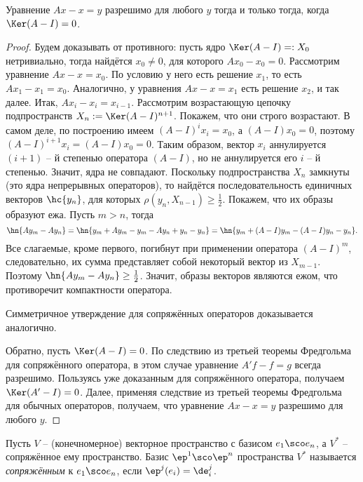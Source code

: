 \documentclass[a4paper]{article}
\begin{document}
\begin{theorem}
Уравнение $Ax-x = y$ разрешимо для любого $y$ тогда и только тогда, когда $\Ker(A-I) = 0$.
\end{theorem}
\begin{proof}
Будем доказывать от противного: пусть ядро $\Ker(A-I) =: X_0$ нетривиально, тогда
найдётся $x_0 \neq 0$, для которого $Ax_0 - x_0 = 0$. Рассмотрим уравнение $Ax -x = x_0$.
По условию у него есть решение $x_1$, то есть $Ax_1 - x_1 = x_0$. Аналогично, у уравнения
$Ax-x = x_1$ есть решение $x_2$, и так далее. Итак, $Ax_i - x_i = x_{i-1}$.
Рассмотрим возрастающую цепочку подпространств $X_n := \Ker(A-I)^{n+1}$.
Покажем, что они строго возрастают. В самом деле, по построению имеем $(A-I)^ix_i = x_0$,
а $(A-I)x_0 = 0$, поэтому $(A-I)^{i+1}x_i = (A-I)x_0 = 0$. Таким образом, вектор $x_i$
аннулируется $(i+1)$ -- й степенью оператора $(A-I)$, но не аннулируется его $i$ -- й степенью.
Значит, ядра не совпадают. Поскольку подпространства $X_n$ замкнуты (это ядра непрерывных операторов),
то найдётся последовательность единичных векторов $\hc{y_n}$, для которых $\rho(y_n, X_{n-1}) \ge \frac12$.
Покажем, что их образы образуют ежа. Пусть $m > n$, тогда
$$\hn{Ay_m - Ay_n} = \hn{y_m + Ay_m - y_m - Ay_n + y_n - y_n} = \hn{y_m + (A-I)y_m - (A-I)y_n - y_n}.$$
Все слагаемые, кроме первого, погибнут при применении оператора $(A-I)^m$, следовательно, их сумма
представляет собой некоторый вектор из $X_{m-1}$. Поэтому $\hn{Ay_m - Ay_n} \ge \frac12$. Значит,
образы векторов являются ежом, что противоречит компактности оператора.

Симметричное утверждение для сопряжённых операторов доказывается аналогично.

Обратно, пусть $\Ker(A-I)=0$. По следствию из третьей теоремы Фредгольма
для сопряжённого оператора, в этом случае уравнение $A'f-f = g$ всегда разрешимо.
Пользуясь уже доказанным  для сопряжённого оператора, получаем $\Ker(A'-I) = 0$.
Далее, применяя следствие из третьей теоремы Фредгольма для обычных операторов,
получаем, что уравнение $Ax -x = y$ разрешимо для любого $y$.
\end{proof}

\begin{df}
Пусть $V$ -- (конечномерное) векторное пространство с базисом $e_1\sco e_n$,
а $V^*$ -- сопряжённое ему пространство. Базис $\ep^1\sco \ep^n$ пространства $V^*$
называется \emph{сопряжённым} к $e_1\sco e_n$, если $\ep^j(e_i) = \de_i^j$.
\end{df}
\end{document}
